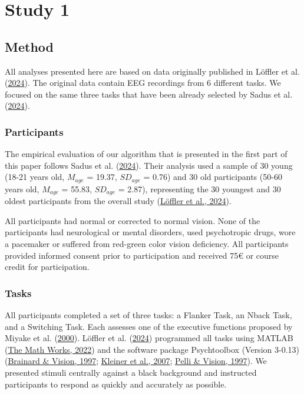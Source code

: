 \documentclass[
  man]{apa7}
\begin{document}
\hypertarget{study-1}{%
\section{Study 1}\label{study-1}}

\hypertarget{method}{%
\subsection{Method}\label{method}}

All analyses presented here are based on data originally published in Löffler et al. (\protect\hyperlink{ref-loffler2024common}{2024}). The original data contain EEG recordings from 6 different tasks. We focused on the same three tasks that have been already selected by Sadus et al. (\protect\hyperlink{ref-sadus2024explorative}{2024}).

\hypertarget{participants}{%
\subsubsection{Participants}\label{participants}}

The empirical evaluation of our algorithm that is presented in the first part of this paper follows Sadus et al. (\protect\hyperlink{ref-sadus2024explorative}{2024}). Their analysis used a sample of 30 young (18-21 years old, \(M_{age}\) = 19.37, \(SD_{age}\) = 0.76) and 30 old participants (50-60 years old, \(M_{age}\) = 55.83, \(SD_{age}\) = 2.87), representing the 30 youngest and 30 oldest participants from the overall study (\protect\hyperlink{ref-loffler2024common}{Löffler et al., 2024}).

All participants had normal or corrected to normal vision. None of the participants had neurological or mental disorders, used psychotropic drugs, wore a pacemaker or suffered from red-green color vision deficiency. All participants provided informed consent prior to participation and received 75€ or course credit for participation.

\hypertarget{tasks}{%
\subsubsection{Tasks}\label{tasks}}

All participants completed a set of three tasks: a Flanker Task, an Nback Task, and a Switching Task. Each assesses one of the executive functions proposed by Miyake et al. (\protect\hyperlink{ref-miyake2000unity}{2000}). Löffler et al. (\protect\hyperlink{ref-loffler2024common}{2024}) programmed all tasks using MATLAB (\protect\hyperlink{ref-matlab2022b}{The Math Works, 2022}) and the software package Psychtoolbox (Version 3-0.13) (\protect\hyperlink{ref-brainard1997psychophysics}{Brainard \& Vision, 1997}; \protect\hyperlink{ref-kleiner2007psychtoolbox}{Kleiner et al., 2007}; \protect\hyperlink{ref-pelli1997videotoolbox}{Pelli \& Vision, 1997}). We presented stimuli centrally against a black background and instructed participants to respond as quickly and accurately as possible.
\end{document}

